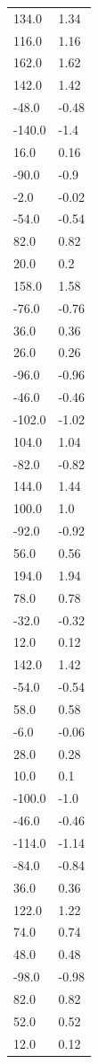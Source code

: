\begin{longtable}{ll}
134.0 & 1.34 \\
116.0 & 1.16 \\
162.0 & 1.62 \\
142.0 & 1.42 \\
-48.0 & -0.48 \\
-140.0 & -1.4 \\
16.0 & 0.16 \\
-90.0 & -0.9 \\
-2.0 & -0.02 \\
-54.0 & -0.54 \\
82.0 & 0.82 \\
20.0 & 0.2 \\
158.0 & 1.58 \\
-76.0 & -0.76 \\
36.0 & 0.36 \\
26.0 & 0.26 \\
-96.0 & -0.96 \\
-46.0 & -0.46 \\
-102.0 & -1.02 \\
104.0 & 1.04 \\
-82.0 & -0.82 \\
144.0 & 1.44 \\
100.0 & 1.0 \\
-92.0 & -0.92 \\
56.0 & 0.56 \\
194.0 & 1.94 \\
78.0 & 0.78 \\
-32.0 & -0.32 \\
12.0 & 0.12 \\
142.0 & 1.42 \\
-54.0 & -0.54 \\
58.0 & 0.58 \\
-6.0 & -0.06 \\
28.0 & 0.28 \\
10.0 & 0.1 \\
-100.0 & -1.0 \\
-46.0 & -0.46 \\
-114.0 & -1.14 \\
-84.0 & -0.84 \\
36.0 & 0.36 \\
122.0 & 1.22 \\
74.0 & 0.74 \\
48.0 & 0.48 \\
-98.0 & -0.98 \\
82.0 & 0.82 \\
52.0 & 0.52 \\
12.0 & 0.12 \\

\end{longtable}
